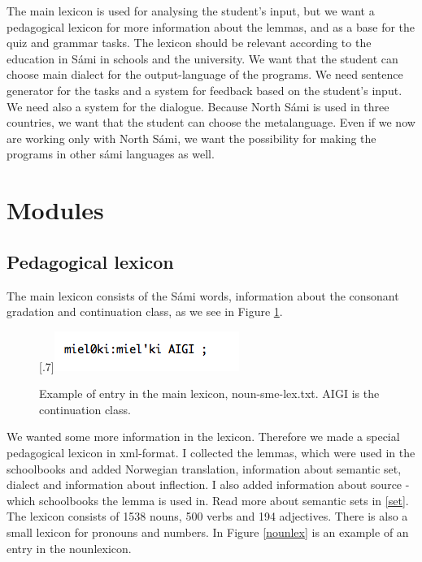 \documentclass[a4paper,12pt]{article}
\begin{document}
The main lexicon is used for analysing the student’s input, but we want a pedagogical lexicon for more information about the lemmas, and as a base for the quiz and grammar tasks. The lexicon should be relevant according to the education in Sámi in schools and the university. We want that the student can choose main dialect for the output-language of the programs. We need sentence generator for the tasks and a system for feedback based on the student’s input. We need also a system for the dialogue. Because North Sámi is used in three countries, we want that the student can choose the metalanguage. Even if we now are working only with North Sámi, we want the possibility for making the programs in other sámi languages as well.

\section{Modules}

\subsection{Pedagogical lexicon}

The main lexicon consists of the Sámi words, information about the consonant gradation and continuation class, as we see in Figure \ref{nounsmelex}.\\


\begin{figure}[htbp]
\begin{center}
\scalebox{.7}[.7]{\includegraphics{img/noun-sme-lex.png}}\\
\caption{Example of entry in the main lexicon, noun-sme-lex.txt. AIGI is the continuation class.}
\label{nounsmelex}
\end{center}
\end{figure}

We wanted some more information in the lexicon. Therefore we made a special pedagogical lexicon in xml-format. I collected the lemmas, which were used in the schoolbooks and added Norwegian translation, information about semantic set, dialect and information about inflection. I also added information about source - which schoolbooks the lemma is used in. Read more about semantic sets in \ref{set}. The lexicon consists of 1538 nouns, 500 verbs and 194 adjectives. There is also a small lexicon for pronouns and numbers. In Figure \ref{nounlex} is an example of an entry in the nounlexicon. \\
\end{document}
